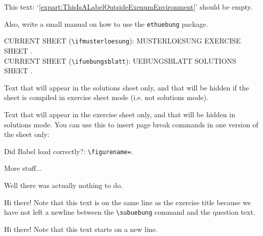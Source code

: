 \documentclass[11pt,a4paper]{article}
\begin{document}
This text: `\ref{expart:ThisIsALabelOutsideExenumEnvironment}' should be empty.



\begin{exenumerate}
\item Also, write a small manual on how to use the \texttt{ethuebung} package.
\end{exenumerate}



CURRENT SHEET (\texttt{\textbackslash ifmusterloesung}):
\ifmusterloesung MUSTERLOESUNG \else EXERCISE SHEET \fi .\\
CURRENT SHEET (\texttt{\textbackslash ifuebungsblatt}):
\ifuebungsblatt UEBUNGSBLATT \else SOLUTIONS SHEET \fi .

\begin{onlysolutions} %
Text that will appear in the solutions sheet only, and that will be hidden if the sheet is
compiled in exercise sheet mode (i.e. not solutions mode).
\end{onlysolutions}
\begin{onlyuebungsblatt} %
Text that will appear in the exercise sheet only, and that will be hidden in solutions
mode. You can use this to insert page break commands in one version of the sheet only:

\newpage
\end{onlyuebungsblatt}

Did Babel load correctly?: \texttt{\textbackslash figurename=}\figurename.




More stuff...

\begin{solution}
  Well there was actually nothing to do.
\end{solution}

Hi there! Note that this text is on the same line as the exercise title because we have
not left a newline between the \texttt{\textbackslash subuebung} command and the question
text.


Hi there! Note that this text starts on a new line.
\end{document}
